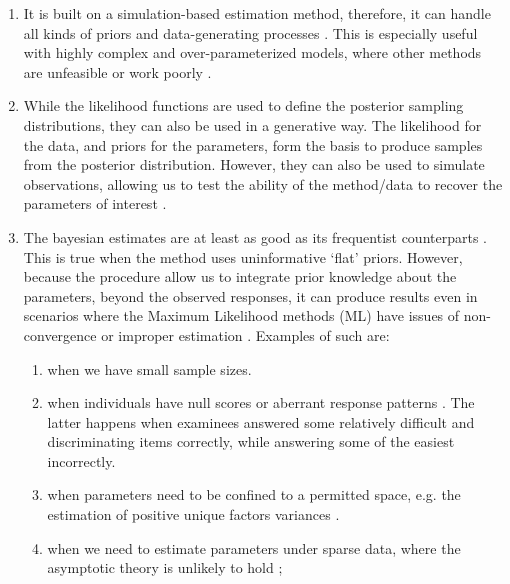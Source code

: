 \begin{enumerate}	
	\item It is built on a simulation-based estimation method, therefore, it can handle all kinds of priors and data-generating processes \cite{Fox_2010}. This is especially useful with highly complex and over-parameterized models, where other methods are unfeasible or work poorly \cite{Baker_1998, Kim_1999}. 
	
	\item While the likelihood functions are used to define the posterior sampling distributions, they can also be used in a generative way. The likelihood for the data, and priors for the parameters, form the basis to produce samples from the posterior distribution. However, they can also be used to simulate observations, allowing us to test the ability of the method/data to recover the parameters of interest \cite{McElreath_2020}.
	
	\item The bayesian estimates are at least as good as its frequentist counterparts \cite{Baker_1998, Wollack_2002, Hsieh_2010}. This is true when the method uses uninformative `flat' priors. However, because the procedure allow us to integrate prior knowledge about the parameters, beyond the observed responses, it can produce results even in scenarios where the Maximum Likelihood methods (ML) have issues of non-convergence or improper estimation \cite{Skrondal_et_al_2004a, Fox_2010, McElreath_2020}. Examples of such are: 
	
	\begin{enumerate}
		\item when we have small sample sizes.
		
		\item when individuals have null scores or aberrant response patterns \cite{Hambleton_et_al_1991a, Azevedo_2003}. The latter happens when examinees answered some relatively difficult and discriminating items correctly, while answering some of the easiest incorrectly.
		
		\item when parameters need to be confined to a permitted space, e.g. the estimation of positive unique factors variances \cite{Martin_et_al_1975}.
		
		\item when we need to estimate parameters under sparse data, where the asymptotic theory is unlikely to hold \cite{Fox_2010};
		
	\end{enumerate}
	
\end{enumerate}


